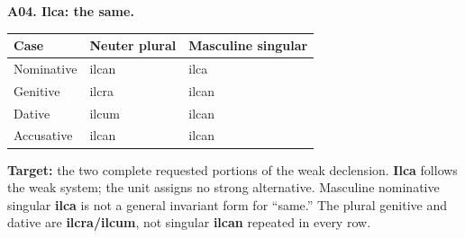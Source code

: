 \par\begin{minipage}{\linewidth}\raggedright
\textbf{A04. Ilca: the same.}

\par\begingroup
\fontsize{10.5}{13.2}\selectfont
\setlength{\LTleft}{0pt}\setlength{\LTright}{\fill}
\noindent
\begin{tabular}{@{}>{\raggedright\arraybackslash}p{39.459mm}>{\raggedright\arraybackslash}p{39.459mm}>{\raggedright\arraybackslash}p{39.459mm}@{}}
\toprule
\textbf{Case} & \textbf{Neuter plural} & \textbf{Masculine singular} \\
\midrule
Nominative & ilcan & ilca \\
Genitive & ilcra & ilcan \\
Dative & ilcum & ilcan \\
Accusative & ilcan & ilcan \\
\bottomrule
\end{tabular}
\par\endgroup
\textbf{Target:} the two complete requested portions of the weak declension. \textbf{Ilca} follows the weak system; the unit assigns no strong alternative. Masculine nominative singular \textbf{ilca} is not a general invariant form for “same.” The plural genitive and dative are \textbf{ilcra/\allowbreak{}ilcum}, not singular \textbf{ilcan} repeated in every row.

\end{minipage}\par\addvspace{4pt}


